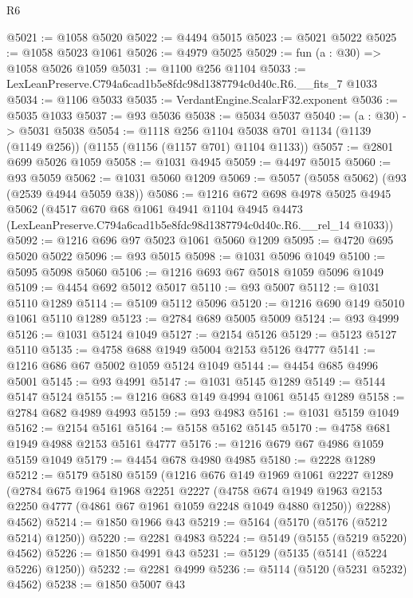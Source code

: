 \begin{lexlean}{R6}
\begin{coremodule}
@5021 := @1058 @5020
@5022 := @4494 @5015
@5023 := @5021 @5022
@5025 := @1058 @5023 @1061
@5026 := @4979 @5025
@5029 := fun (a : @30) => @1058 @5026 @1059
@5031 := @1100 @256 @1104
@5033 := LexLeanPreserve.C794a6cad1b5e8fdc98d1387794c0d40c.R6.__fits_7 @1033
@5034 := @1106 @5033
@5035 := VerdantEngine.ScalarF32.exponent
@5036 := @5035 @1033
@5037 := @93 @5036
@5038 := @5034 @5037
@5040 := (a : @30) -> @5031 @5038
@5054 := @1118
    @256
    @1104
    @5038
    @701
    @1134
    (@1139 (@1149 @256))
    (@1155 (@1156 (@1157 @701) @1104 @1133))
@5057 := @2801 @699 @5026 @1059
@5058 := @1031 @4945
@5059 := @4497 @5015
@5060 := @93 @5059
@5062 := @1031 @5060 @1209
@5069 := @5057 (@5058 @5062) (@93 (@2539 @4944 @5059 @38))
@5086 := @1216
    @672
    @698
    @4978
    @5025
    @4945
    @5062
    (@4517
      @670
      @68
      @1061
      @4941
      @1104
      @4945
      @4473
      (LexLeanPreserve.C794a6cad1b5e8fdc98d1387794c0d40c.R6.__rel_14 @1033))
@5092 := @1216 @696 @97 @5023 @1061 @5060 @1209
@5095 := @4720 @695 @5020 @5022
@5096 := @93 @5015
@5098 := @1031 @5096 @1049
@5100 := @5095 @5098 @5060
@5106 := @1216 @693 @67 @5018 @1059 @5096 @1049
@5109 := @4454 @692 @5012 @5017
@5110 := @93 @5007
@5112 := @1031 @5110 @1289
@5114 := @5109 @5112 @5096
@5120 := @1216 @690 @149 @5010 @1061 @5110 @1289
@5123 := @2784 @689 @5005 @5009
@5124 := @93 @4999
@5126 := @1031 @5124 @1049
@5127 := @2154 @5126
@5129 := @5123 @5127 @5110
@5135 := @4758 @688 @1949 @5004 @2153 @5126 @4777
@5141 := @1216 @686 @67 @5002 @1059 @5124 @1049
@5144 := @4454 @685 @4996 @5001
@5145 := @93 @4991
@5147 := @1031 @5145 @1289
@5149 := @5144 @5147 @5124
@5155 := @1216 @683 @149 @4994 @1061 @5145 @1289
@5158 := @2784 @682 @4989 @4993
@5159 := @93 @4983
@5161 := @1031 @5159 @1049
@5162 := @2154 @5161
@5164 := @5158 @5162 @5145
@5170 := @4758 @681 @1949 @4988 @2153 @5161 @4777
@5176 := @1216 @679 @67 @4986 @1059 @5159 @1049
@5179 := @4454 @678 @4980 @4985
@5180 := @2228 @1289
@5212 := @5179
    @5180
    @5159
    (@1216
      @676
      @149
      @1969
      @1061
      @2227
      @1289
      (@2784
        @675
        @1964
        @1968
        @2251
        @2227
        (@4758 @674 @1949 @1963 @2153 @2250 @4777 (@4861 @67 @1961 @1059 @2248 @1049 @4880 @1250))
        @2288)
      @4562)
@5214 := @1850 @1966 @43
@5219 := @5164 (@5170 (@5176 (@5212 @5214) @1250))
@5220 := @2281 @4983
@5224 := @5149 (@5155 (@5219 @5220) @4562)
@5226 := @1850 @4991 @43
@5231 := @5129 (@5135 (@5141 (@5224 @5226) @1250))
@5232 := @2281 @4999
@5236 := @5114 (@5120 (@5231 @5232) @4562)
@5238 := @1850 @5007 @43

\end{coremodule}
\end{lexlean}
